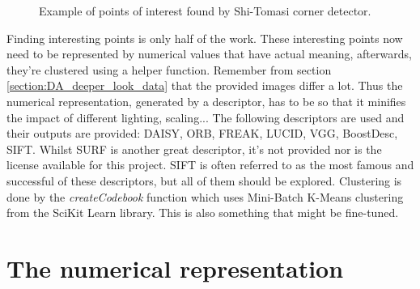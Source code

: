 \begin{figure}[H]
    \centering
    \captionsetup{width=0.7\linewidth}
    \captionsetup{justification=centering}
    \caption{Example of points of interest found by Shi-Tomasi corner detector.}
    \label{fig:1-data_analysis-POI}
\end{figure}

Finding interesting points is only half of the work.
These interesting points now need to be represented by numerical values that have actual meaning, afterwards, they're clustered using a helper function.
Remember from section \ref{section:DA_deeper_look_data} that the provided images differ a lot.
Thus the numerical representation, generated by a descriptor, has to be so that it minifies the impact of different lighting, scaling...
The following descriptors are used and their outputs are provided: DAISY, ORB, FREAK, LUCID, VGG, BoostDesc, SIFT.
Whilst SURF is another great descriptor, it's not provided nor is the license available for this project.
SIFT is often referred to as the most famous and successful of these descriptors, but all of them should be explored.
Clustering is done by the \emph{createCodebook} function which uses Mini-Batch K-Means clustering from the SciKit Learn library.
This is also something that might be fine-tuned.


\section{The numerical representation}
\label{section:DA_numerical_representation}

